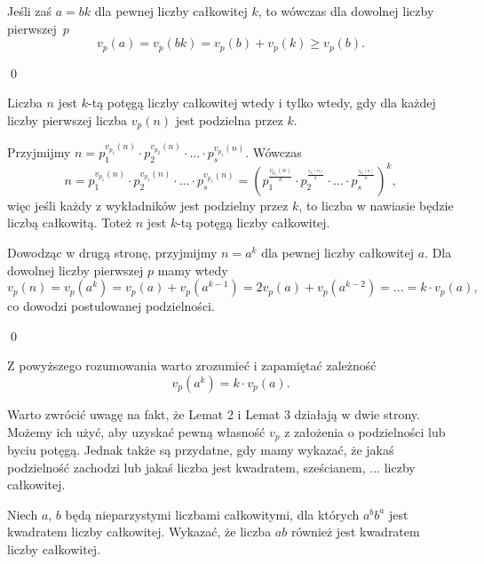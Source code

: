 \vspace{5px}

\noindent
Jeśli zaś $a = bk$ dla pewnej liczby całkowitej $k$, to wówczas dla dowolnej liczby pierwszej~$p$
\[
	v_p(a) = v_p(bk) = v_p(b) + v_p(k) \geqslant v_p(b).
\]

\qed


\noindent
Liczba $n$ jest $k$-tą potęgą liczby całkowitej wtedy i tylko wtedy, gdy dla każdej liczby pierwszej liczba $v_p(n)$ jest podzielna przez $k$. 

\vspace{5px}


\noindent
Przyjmijmy 
$ n = p_1^{v_{p_1}(n)} \cdot p_2^{v_{p_2}(n)} \cdot ... \cdot p_s^{v_{p_1}(n)}. $
Wówczas
\[
	n = p_1^{v_{p_1}(n)} \cdot p_2^{v_{p_1}(n)} \cdot ... \cdot p_s^{v_{p_1}(n)} = \left( p_1^{\frac{v_{p_1}(n)}{k}} \cdot p_2^{^{\frac{v_{p_2}(n)}{k}}} \cdot ... \cdot p_s^{^{\frac{v_{p_s}(n)}{k}}}\right)^k,
\]
więc jeśli każdy z wykładników jest podzielny przez $k$, to liczba w nawiasie będzie liczbą całkowitą. Toteż $n$ jest $k$-tą potęgą liczby całkowitej.

\vspace{10px}

\noindent
Dowodząc w drugą stronę, przyjmijmy $n = a^k$ dla pewnej liczby całkowitej $a$. Dla dowolnej liczby pierwszej $p$ mamy wtedy
\[
	v_p(n) = v_p(a^k) = v_p(a) + v_p(a^{k - 1}) = 2v_p(a) + v_p(a^{k - 2}) = ... =  k \cdot v_p(a),
\]
co dowodzi postulowanej podzielności.

\qed

\vspace{10px}

\noindent
Z powyższego rozumowania warto zrozumieć i zapamiętać zależność
\[
	v_p(a^k) =  k \cdot v_p(a).
\]

\noindent
Warto zwrócić uwagę na fakt, że Lemat 2 i Lemat 3 działają w dwie strony. Możemy ich użyć, aby uzyskać pewną własność $v_p$ z założenia o podzielności lub byciu potęgą. Jednak także są przydatne, gdy mamy wykazać, że jakaś podzielność zachodzi lub jakaś liczba jest kwadratem, sześcianem, ... liczby całkowitej.

\vspace{10px}


\noindent
Niech $a$, $b$ będą nieparzystymi liczbami całkowitymi, dla których $a^bb^a$ jest kwadratem liczby całkowitej. Wykazać, że liczba $ab$ również jest kwadratem liczby całkowitej.

